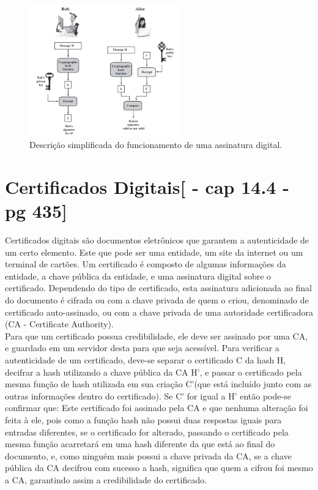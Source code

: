 \documentclass{article}
\begin{document}
	\begin{figure}[hb!]
		\centering
		\includegraphics[width=250px]{AssinaturaDigital.png}
		\caption{Descrição simplificada do funcionamento de uma assinatura digital.}
		\label{fig:digiSign}

	\end{figure}

	\section{Certificados Digitais[\cite{STALLINS} - cap 14.4 - pg 435]}
		\begin{flushleft}
			
				
				\hspace{2cm}Certificados digitais são documentos eletrônicos que garantem a autenticidade de um certo elemento. Este que pode ser uma entidade, um site da internet ou um terminal de cartões. Um certificado é composto de algumas informações da entidade,  a chave pública da entidade, e uma assinatura digital sobre o certificado. Dependendo do tipo de certificado, esta assinatura adicionada ao final do documento é cifrada ou com a chave privada de quem o criou, denominado de certificado auto-assinado, ou com a chave privada de uma autoridade certificadora (CA - Certificate Authority). \\
				\hspace{2cm} Para que um certificado possua credibilidade, ele deve ser assinado por uma CA, e guardado em um servidor desta para que seja acessível. Para verificar a autenticidade de um certificado, deve-se separar o certificado C da hash H, decifrar a hash utilizando a chave pública da CA H’, e passar o certificado pela mesma função de hash utilizada em sua criação C’(que está incluído junto com as outras informações dentro do certificado). Se C’ for igual a H’ então pode-se confirmar que: Este certificado foi assinado pela CA e que nenhuma alteração foi feita à ele, pois como a função hash não possui duas respostas iguais para entradas diferentes, se o certificado for alterado, passando o certificado pela mesma função acarretará em uma hash diferente da que está ao final do documento, e, como ninguém mais possui a chave privada da CA, se a chave pública da CA decifrou com sucesso a hash, significa que quem a cifrou foi mesmo a CA, garantindo assim a credibilidade do certificado.

			
		\end{flushleft}
\end{document}
